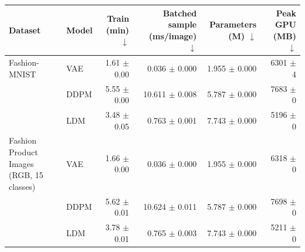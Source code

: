 \begin{tabular}{llrrrr}
\toprule
Dataset & Model & Train (min) $\downarrow$ & Batched sample (ms/image) $\downarrow$ & Parameters (M) $\downarrow$ & Peak GPU (MB) $\downarrow$ \\
\midrule
Fashion-MNIST & VAE & 1.61 $\pm$ 0.00 & 0.036 $\pm$ 0.000 & 1.955 $\pm$ 0.000 & 6301 $\pm$ 4 \\
 & DDPM & 5.55 $\pm$ 0.00 & 10.611 $\pm$ 0.008 & 5.787 $\pm$ 0.000 & 7683 $\pm$ 0 \\
 & LDM & 3.48 $\pm$ 0.05 & 0.763 $\pm$ 0.001 & 7.743 $\pm$ 0.000 & 5196 $\pm$ 0 \\
\midrule
Fashion Product Images (RGB, 15 classes) & VAE & 1.66 $\pm$ 0.00 & 0.036 $\pm$ 0.000 & 1.955 $\pm$ 0.000 & 6318 $\pm$ 0 \\
 & DDPM & 5.62 $\pm$ 0.01 & 10.624 $\pm$ 0.011 & 5.787 $\pm$ 0.000 & 7698 $\pm$ 0 \\
 & LDM & 3.78 $\pm$ 0.01 & 0.765 $\pm$ 0.003 & 7.743 $\pm$ 0.000 & 5211 $\pm$ 0 \\
\bottomrule
\end{tabular}
